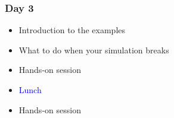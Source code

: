 
\begin{frame}
  \frametitle{Day 3}
  \begin{itemize}[]
  \item[] Introduction to the examples
  \item[] What to do when your simulation breaks
  \item[] Hands-on session
  \item[] \textcolor{blue}{Lunch}
  \item[] Hands-on session
  \end{itemize}
\end{frame}
